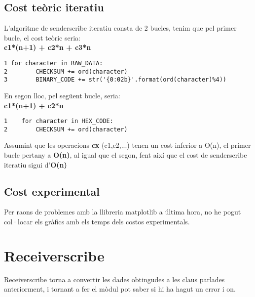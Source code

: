 \documentclass{article}
\begin{document}
\subsection{Cost teòric iteratiu}
L'algoritme de senderscribe iteratiu consta de 2 bucles, tenim que
pel primer bucle, el cost teòric seria:\\
\textbf{c1*(n+1) + c2*n + c3*n}
\begin{lstlisting}
1 for character in RAW_DATA:
2        CHECKSUM += ord(character)
3        BINARY_CODE += str('{0:02b}'.format(ord(character)%4))
\end{lstlisting}
En segon lloc, pel següent bucle, seria: \\
\textbf{c1*(n+1) + c2*n}
\begin{lstlisting}
1    for character in HEX_CODE:
2        CHECKSUM += ord(character)
\end{lstlisting}
Assumint que les operacions \textbf{cx} (c1,c2,...) tenen un 
cost inferior a O(n), el primer bucle pertany a \textbf{O(n)}, 
al igual que el segon, fent així que el cost de senderscribe 
iteratiu sigui d'\textbf{O(n)}

\subsection{Cost experimental}
Per raons de problemes amb la llibreria matplotlib a última hora,
no he pogut col·locar els gràfics amb els temps dels 
costos experimentals.
\newpage
\section{Receiverscribe}
Receiverscribe torna a convertir les dades obtingudes a les claus 
parlades anteriorment, i tornant a fer el mòdul pot saber si hi ha hagut
un error i on.
\end{document}
